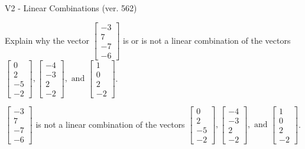\begin{exercise}
  \begin{exerciseTitle}V2 - Linear Combinations (ver. 562)\end{exerciseTitle}
  \begin{exerciseStatement}
    Explain why the vector \(\left[\begin{array}{c}
-3 \\
7 \\
-7 \\
-6
\end{array}\right]\)  is or is not a linear 
	combination of the vectors \(\left[\begin{array}{c}
0 \\
2 \\
-5 \\
-2
\end{array}\right] , \left[\begin{array}{c}
-4 \\
-3 \\
2 \\
-2
\end{array}\right] , \text{ and } \left[\begin{array}{c}
1 \\
0 \\
2 \\
-2
\end{array}\right]\).
	


  \end{exerciseStatement}
  \begin{exerciseAnswer}
   \(\left[\begin{array}{c}
-3 \\
7 \\
-7 \\
-6
\end{array}\right]\) 
  	 is not  
	a linear combination of the vectors \(\left[\begin{array}{c}
0 \\
2 \\
-5 \\
-2
\end{array}\right] , \left[\begin{array}{c}
-4 \\
-3 \\
2 \\
-2
\end{array}\right] , \text{ and } \left[\begin{array}{c}
1 \\
0 \\
2 \\
-2
\end{array}\right]\).

	
  


  \end{exerciseAnswer}
\end{exercise}